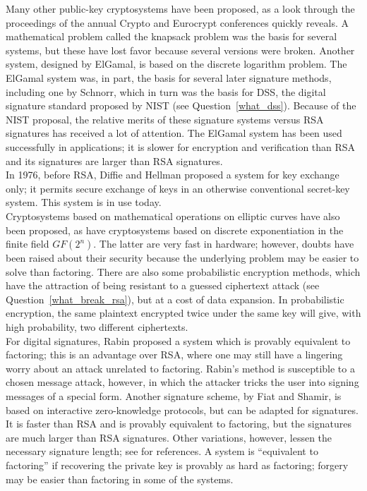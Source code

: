 Many other public-key cryptosystems have been proposed, as a look through
the proceedings of the annual Crypto and Eurocrypt conferences quickly
reveals. A mathematical problem called the knapsack problem was the basis
for several systems, but these have lost favor because several versions
were broken. Another system, designed by ElGamal, is based on the discrete
logarithm problem. The ElGamal system was, in part, the basis for several
later signature methods, including one by Schnorr, which in turn was the
basis for DSS, the digital signature standard proposed by NIST (see
Question~\ref{what_dss}). Because of the NIST proposal, the relative merits
of these signature systems versus RSA signatures has received a lot of
attention. The ElGamal system has been used successfully in applications;
it is slower for encryption and verification than RSA and its signatures
are larger than RSA signatures.\\

In 1976, before RSA, Diffie and Hellman proposed a system for key
exchange only; it permits secure exchange of keys in an otherwise
conventional secret-key system. This system is in use today.\\

Cryptosystems based on mathematical operations on elliptic curves have also
been proposed, as have cryptosystems based on discrete exponentiation in
the finite field $GF(2^n)$. The latter are very fast in hardware; however,
doubts have been raised about their security because the underlying problem
may be easier to solve than factoring. There are also some probabilistic
encryption methods, which have the attraction of being resistant to a
guessed ciphertext attack (see Question~\ref{what_break_rsa}), but at a
cost of data expansion. In probabilistic encryption, the same plaintext
encrypted twice under the same key will give, with high probability, two
different ciphertexts.\\

For digital signatures, Rabin proposed a system which is provably
equivalent to factoring; this is an advantage over RSA, where one may
still have a lingering worry about an attack unrelated to factoring.
Rabin's method is susceptible to a chosen message attack, however, in
which the attacker tricks the user into signing messages of a special
form. Another signature scheme, by Fiat and Shamir, is based on
interactive zero-knowledge protocols, but can be adapted for
signatures. It is faster than RSA and is provably equivalent to
factoring, but the signatures are much larger than RSA signatures.
Other variations, however, lessen the necessary signature length; see
for references. A system is ``equivalent to factoring'' if recovering
the private key is provably as hard as factoring; forgery may be easier
than factoring in some of the systems.\\


